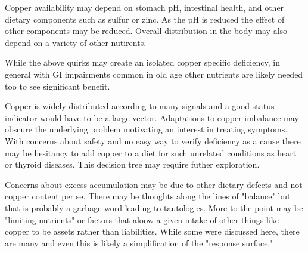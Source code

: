 Copper availability may depend on stomach pH, intestinal health,
 and other dietary
components such as sulfur or zinc. As the pH is reduced the effect of
other components may be reduced. Overall distribution in the body
may also depend on a variety of other nutirents. 

While the above quirks may create an isolated copper specific deficiency,
in general with GI impairments common in old age other nutrients
are likely needed too to see significant benefit.

Copper is widely distributed according to many signals and
a good status indicator would have to be a large vector.
Adaptations to copper imbalance may obscure the underlying problem
motivating an interest in treating symptoms. With concerns about
safety and no easy way to verify deficiency as a cause there may
be hesitancy to add copper to a diet for such unrelated conditions
as heart or thyroid diseases.  This decision tree may 
require futher exploration. 

Concerns about excess accumulation may be due to other dietary defects
and not copper content per se.  There may be thoughts along the
lines of "balance" but that is probably a garbage word leading
to tautologies. More to the point may be "limiting nutrients" or
factors that aloow a given intake of other things like copper
to be assets rather than liabilities. While some were discussed here,
there are many and even this is likely a simplification of 
the "response surface." 


